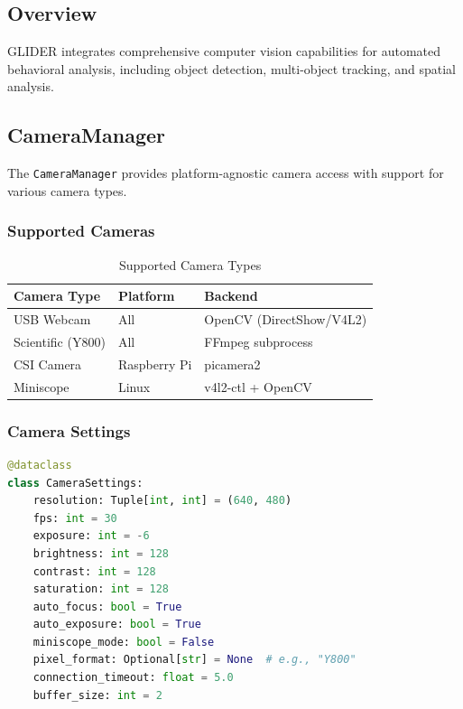 \documentclass[11pt,a4paper]{article}
\begin{document}
\subsection{Overview}

GLIDER integrates comprehensive computer vision capabilities for automated behavioral analysis, including object detection, multi-object tracking, and spatial analysis.

\subsection{CameraManager}

The \texttt{CameraManager} provides platform-agnostic camera access with support for various camera types.

\subsubsection{Supported Cameras}

\begin{table}[H]
\centering
\begin{tabular}{@{}lll@{}}
\toprule
\textbf{Camera Type} & \textbf{Platform} & \textbf{Backend} \\
\midrule
USB Webcam & All & OpenCV (DirectShow/V4L2) \\
Scientific (Y800) & All & FFmpeg subprocess \\
CSI Camera & Raspberry Pi & picamera2 \\
Miniscope & Linux & v4l2-ctl + OpenCV \\
\bottomrule
\end{tabular}
\caption{Supported Camera Types}
\end{table}

\subsubsection{Camera Settings}

\begin{lstlisting}[language=Python]
@dataclass
class CameraSettings:
    resolution: Tuple[int, int] = (640, 480)
    fps: int = 30
    exposure: int = -6
    brightness: int = 128
    contrast: int = 128
    saturation: int = 128
    auto_focus: bool = True
    auto_exposure: bool = True
    miniscope_mode: bool = False
    pixel_format: Optional[str] = None  # e.g., "Y800"
    connection_timeout: float = 5.0
    buffer_size: int = 2
\end{lstlisting}
\end{document}
